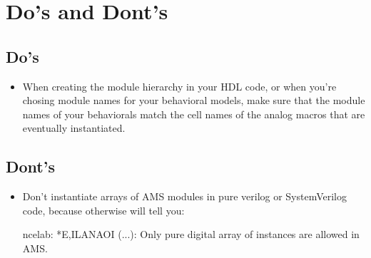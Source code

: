 \chapter{Do's and Dont's}
\section{Do's}
\begin{itemize}
    \item When creating the module hierarchy in your HDL code, or when you're chosing module names for your behavioral models, make sure that the module names of your behaviorals match the cell names of the analog macros that are eventually instantiated.
\end{itemize}
\section{Dont's}
\begin{itemize}
	\item Don't instantiate arrays of AMS modules in pure verilog or SystemVerilog code, because otherwise  will tell you:
\begin{lstbashplain}
ncelab: *E,ILANAOI (...): Only pure digital array of instances are allowed in AMS.
\end{lstbashplain}
\end{itemize}
